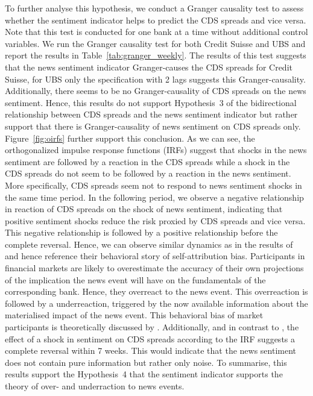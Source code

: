 To further analyse this hypothesis, we conduct a Granger causality test to assess whether the sentiment indicator helps to predict the CDS spreads and vice versa. Note that this test is conducted for one bank at a time without additional control variables. We run the Granger causality test for both Credit Suisse and UBS and report the results in \mbox{Table~\ref{tab:granger_weekly}}. The results of this test suggests that the news sentiment indicator Granger-causes the CDS spreads for Credit Suisse, for UBS only the specification with 2 lags suggests this Granger-causality. Additionally, there seems to be no Granger-causality of CDS spreads on the news sentiment. Hence, this results do not support \mbox{Hypothesis~3} of the bidirectional relationship between CDS spreads and the news sentiment indicator but rather support that there is Granger-causality of news sentiment on CDS spreads only. \\



\mbox{Figure~\ref{fig:oirfs}} further support this conclusion. As we can see, the orthogonalized impulse response functions (IRFs) suggest that shocks in the news sentiment are followed by a reaction in the CDS spreads while a shock in the CDS spreads do not seem to be followed by a reaction in the news sentiment. More specifically, CDS spreads seem not to respond to news sentiment shocks in the same time period. In the following period, we observe a negative relationship in reaction of CDS spreads on the shock of news sentiment, indicating that positive sentiment shocks reduce the risk proxied by CDS spreads and vice versa. This negative relationship is followed by a positive relationship before the complete reversal. Hence, we can observe similar dynamics as in the results of \cite{cathcart2020} and hence reference their behavioral story of self-attribution bias. Participants in financial markets are likely to overestimate the accuracy of their own projections of the implication the news event will have on the fundamentals of the corresponding bank. Hence, they overreact to the news event. This overreaction is followed by a underreaction, triggered by the now available information about the materialised impact of the news event. This behavioral bias of market participants is theoretically discussed by \cite{daniel1998}. Additionally, and in contrast to \cite{cathcart2020}, the effect of a shock in sentiment on CDS spreads according to the IRF suggests a complete reversal within 7 weeks. This would indicate that the news sentiment does not contain pure information but rather only noise. To summarise, this results support the \mbox{Hypothesis~4} that the sentiment indicator supports the theory of over- and underraction to news events. \\

